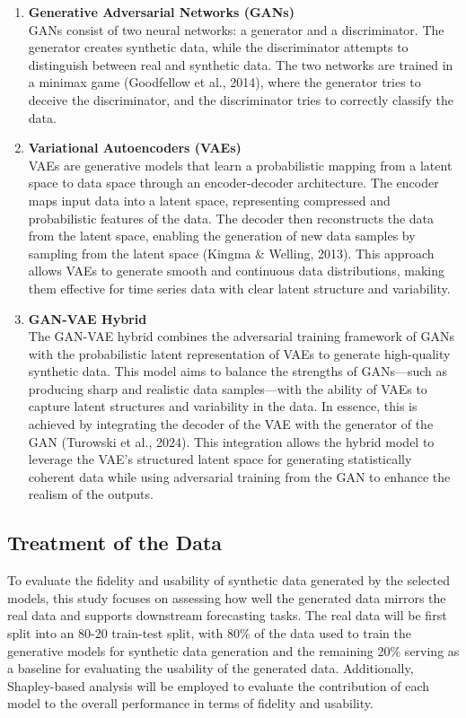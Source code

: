 \documentclass{article}
\begin{document}
\begin{enumerate}
    \item \textbf{Generative Adversarial Networks (GANs)}\\
    GANs consist of two neural networks: a generator and a discriminator. The generator creates synthetic data, while the discriminator attempts to distinguish between real and synthetic data. The two networks are trained in a minimax game (Goodfellow et al., 2014), where the generator tries to deceive the discriminator, and the discriminator tries to correctly classify the data. 

    \item \textbf{Variational Autoencoders (VAEs)}\\
    VAEs are generative models that learn a probabilistic mapping from a latent space to data space through an encoder-decoder architecture. The encoder maps input data into a latent space, representing compressed and probabilistic features of the data. The decoder then reconstructs the data from the latent space, enabling the generation of new data samples by sampling from the latent space (Kingma \& Welling, 2013). This approach allows VAEs to generate smooth and continuous data distributions, making them effective for time series data with clear latent structure and variability.

    \item \textbf{GAN-VAE Hybrid}\\
    The GAN-VAE hybrid combines the adversarial training framework of GANs with the probabilistic latent representation of VAEs to generate high-quality synthetic data.  This model aims to balance the strengths of GANs—such as producing sharp and realistic data samples—with the ability of VAEs to capture latent structures and variability in the data. In essence, this is achieved by integrating the decoder of the VAE with the generator of the GAN (Turowski et al., 2024). This integration allows the hybrid model to leverage the VAE’s structured latent space for generating statistically coherent data while using adversarial training from the GAN to enhance the realism of the outputs.
\end{enumerate}

\subsection{Treatment of the Data}
To evaluate the fidelity and usability of synthetic data generated by the selected models, this study focuses on assessing how well the generated data mirrors the real data and supports downstream forecasting tasks. The real data will be first split into an 80-20 train-test split, with 80\% of the data used to train the generative models for synthetic data generation and the remaining 20\% serving as a baseline for evaluating the usability of the generated data. Additionally, Shapley-based analysis will be employed to evaluate the contribution of each model to the overall performance in terms of fidelity and usability.
\end{document}
